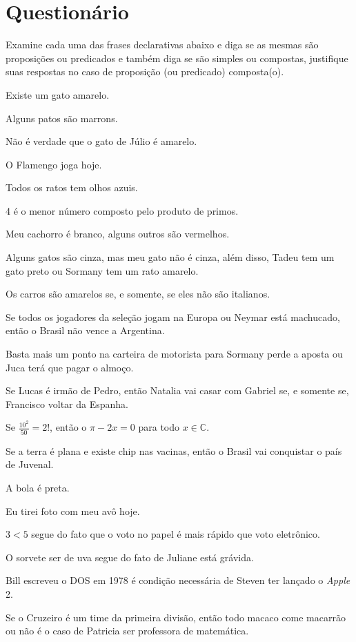 \section{Questionário}\label{sec:Questionario1part3}

\begin{problem}
    Examine cada uma das frases declarativas abaixo e diga se as mesmas são proposições ou predicados e também diga se são simples ou compostas, justifique suas respostas no caso de proposição (ou predicado) composta(o).
\end{problem}

\begin{exerList}
	\item Existe um gato amarelo.
	\item Alguns patos são marrons.
	\item Não é verdade que o gato de Júlio é amarelo.
	\item O Flamengo joga hoje.
	\item Todos os ratos tem olhos azuis.
	\item 4 é o menor número composto pelo produto de primos.
	\item Meu cachorro é branco, alguns outros são vermelhos.
	\item Alguns gatos são cinza, mas meu gato não é cinza, além disso, Tadeu tem um gato preto ou Sormany tem um rato amarelo.
	\item Os carros são amarelos se, e somente, se eles não são italianos.
	\item Se todos os jogadores da seleção jogam na Europa ou Neymar está machucado, então o Brasil não vence a Argentina.
	\item Basta mais um ponto na carteira de motorista para Sormany perde a aposta ou Juca terá que pagar o almoço.
	\item Se Lucas é irmão de Pedro, então Natalia vai casar com Gabriel se, e somente se, Francisco voltar da Espanha.
	\item Se $\frac{10^2}{50} = 2!$, então o $\pi - 2x = 0$ para todo $x \in \mathbb{C}$.
	\item Se a terra é plana e existe chip nas vacinas, então o Brasil vai conquistar o país de Juvenal. 
	\item A bola é preta.
	\item Eu tirei foto com meu avô hoje.
	\item $3 < 5$ segue do fato que o  voto no papel é mais rápido que voto eletrônico.
	\item O sorvete ser de uva segue do fato de Juliane está grávida.
	\item Bill escreveu o DOS em 1978 é condição necessária de Steven ter lançado o \textit{Apple} 2.
	\item Se o Cruzeiro é um time da primeira divisão, então todo macaco come macarrão ou não é o caso de Patricia ser professora de matemática. 
\end{exerList}

